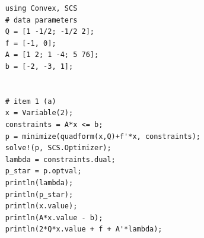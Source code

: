 \documentclass[12pt,a4paper]{article}
\begin{document}
\subanswer

\begin{verbatim}
    using Convex, SCS
    # data parameters
    Q = [1 -1/2; -1/2 2];
    f = [-1, 0];
    A = [1 2; 1 -4; 5 76];
    b = [-2, -3, 1];
    
    
    # item 1 (a)
    x = Variable(2);
    constraints = A*x <= b;
    p = minimize(quadform(x,Q)+f'*x, constraints);
    solve!(p, SCS.Optimizer);
    lambda = constraints.dual;
    p_star = p.optval;
    println(lambda);
    println(p_star);
    println(x.value);
    println(A*x.value - b);
    println(2*Q*x.value + f + A'*lambda);
\end{verbatim}
\end{document}
